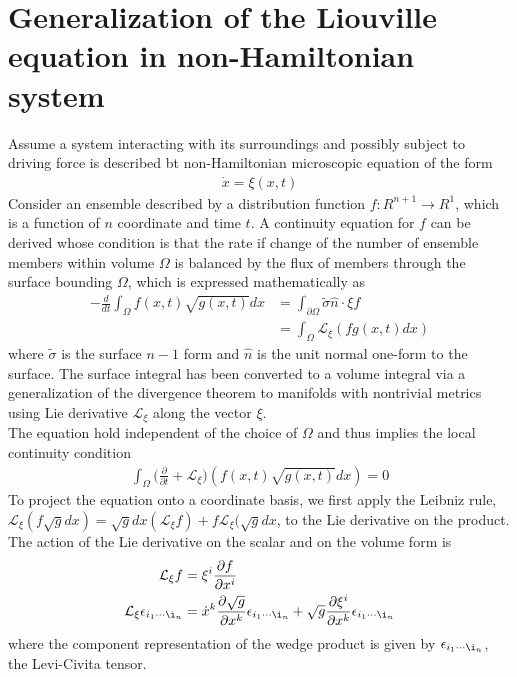 \documentclass{article}
\begin{document}
\section{Generalization of the Liouville equation in non-Hamiltonian system}
Assume a system interacting with its surroundings and possibly subject to driving force is described bt non-Hamiltonian microscopic equation of the form
\begin{align}
\dot{x}=\xi(x,t)
\end{align}
Consider an ensemble described by a distribution function $f:R^{n+1}\rightarrow R^1$, which is a function of $n$ coordinate and time $t$. A continuity equation for $f$ can be derived whose condition is that the rate if change of the number of ensemble members within volume $\Omega$ is balanced by the flux of members through the surface bounding $\Omega$, which is expressed mathematically as
\begin{align}
-\frac{d}{dt}\int_{\Omega}f(x,t)\sqrt{g(x,t)}dx&=\int_{\partial\Omega}\tilde{\sigma}\hat{n}\cdot \xi f\nonumber\\
&=\int_{\Omega}\mathcal{L}_{\xi}(fg(x,t)dx)
\end{align}
where $\tilde{\sigma}$ is the surface $n-1$ form and $\hat{n}$ is the unit normal one-form to the surface. The surface integral has been converted to a volume integral via a generalization of the divergence theorem to manifolds with nontrivial metrics using Lie derivative $\mathcal{L}_{\xi}$ along the vector $\xi$.\\
The equation hold independent of the choice of $\Omega$ and thus implies the local continuity condition
\begin{align}
\int_{\Omega}\bigg(\frac{\partial}{\partial t}+\mathcal{L}_{\xi}\bigg)(f(x,t)\sqrt{g(x,t)}dx)=0
\end{align}
To project the equation onto a coordinate basis, we first apply the Leibniz rule, $\mathcal{L}_{\xi}(f\sqrt{g}dx)=\sqrt{g}dx(\mathcal{L}_{\xi}f)+f\mathcal{L}_{\xi}(\sqrt{g}dx$, to the Lie derivative on the product. The action of the Lie derivative on the scalar and on the volume form is
\begin{align}
\mathcal{L}_{\xi}f&=\xi^i\frac{\partial f}{\partial x^i}\nonumber\\
\mathcal{L}_{\xi}\epsilon_{i_1\cdots\i_n}&=\dot{x}^k\frac{\partial\sqrt{g}}{\partial x^k}\epsilon_{i_1\cdots\i_n}+\sqrt{g}\frac{\partial\xi^i}{\partial x^k}\epsilon_{i_1\cdots\i_n}
\end{align}
where the component representation of the wedge product is given by $\epsilon_{i_1\cdots\i_n}$, the Levi-Civita tensor.\\
\end{document}
